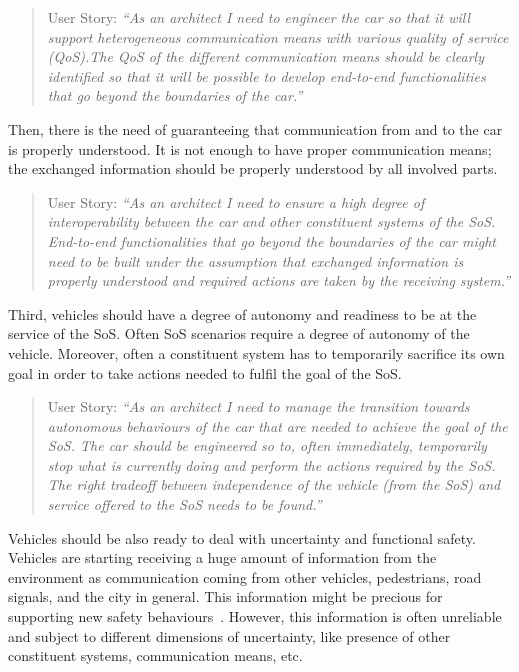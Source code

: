 \begin{quote}
{User Story:} 
\emph{``As an architect I need to engineer the car so that it will support heterogeneous communication means with various quality of service (QoS).The QoS of the different communication means should be clearly identified
so that it will be possible to develop end-to-end functionalities that go beyond the boundaries of the car.''} %
\end{quote}

Then, there is the need of guaranteeing that communication from and to the car is properly understood. It is not enough to have proper communication means; the exchanged information should be properly understood by all involved parts.

\begin{quote}
{User Story:} 
\emph{``As an architect I need to ensure a high degree of interoperability between the car and other constituent systems of the SoS. End-to-end functionalities that go beyond the boundaries of the car might need to be built under the assumption that exchanged information is properly understood and required actions are taken by the receiving system.''} %
\end{quote}

Third, vehicles should have a degree of autonomy and readiness to be at the service of the SoS. Often SoS scenarios require a degree of autonomy of the vehicle. Moreover, often a constituent system has to temporarily sacrifice its own goal in order to take actions needed to fulfil the goal of the SoS.

\begin{quote}
{User Story:} 
\emph{``As an architect I need to manage the transition towards autonomous behaviours of the car that are needed to achieve the goal of the SoS. %
The car should be engineered so to, often immediately, temporarily stop what is currently doing and 
perform the actions required by the SoS. The right tradeoff between independence of the vehicle (from the SoS) and service offered to the SoS needs to be found.''}
\end{quote}

Vehicles should be also ready to deal with uncertainty and functional safety. Vehicles are starting receiving a huge amount of information from the environment as communication coming from other vehicles, pedestrians, road signals, and the city in general. This information might be precious for supporting new safety behaviours~\cite{VCC}. %
However, this information is often unreliable and subject to different dimensions of uncertainty, like presence of other constituent systems, communication means, etc.

